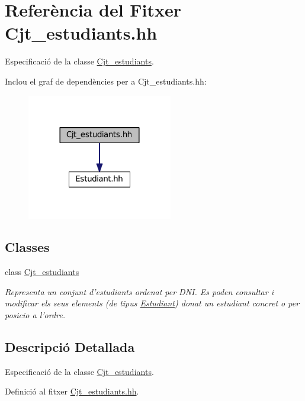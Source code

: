 \hypertarget{_cjt__estudiants_8hh}{\section{Referència del Fitxer Cjt\+\_\+estudiants.\+hh}
\label{_cjt__estudiants_8hh}
}


Especificació de la classe \hyperlink{class_cjt__estudiants}{Cjt\+\_\+estudiants}.  


Inclou el graf de dependències per a Cjt\+\_\+estudiants.\+hh\+:\nopagebreak
\begin{figure}[H]
\begin{center}
\leavevmode
\includegraphics[width=180pt]{_cjt__estudiants_8hh__incl}
\end{center}
\end{figure}
\subsection*{Classes}
\begin{DoxyCompactItemize}
\item 
class \hyperlink{class_cjt__estudiants}{Cjt\+\_\+estudiants}
\begin{DoxyCompactList}\small\item\em Representa un conjunt d'estudiants ordenat per D\+N\+I. Es poden consultar i modificar els seus elements (de tipus \hyperlink{class_estudiant}{Estudiant}) donat un estudiant concret o per posicio a l'ordre. \end{DoxyCompactList}\end{DoxyCompactItemize}


\subsection{Descripció Detallada}
Especificació de la classe \hyperlink{class_cjt__estudiants}{Cjt\+\_\+estudiants}. 



Definició al fitxer \hyperlink{_cjt__estudiants_8hh_source}{Cjt\+\_\+estudiants.\+hh}.

